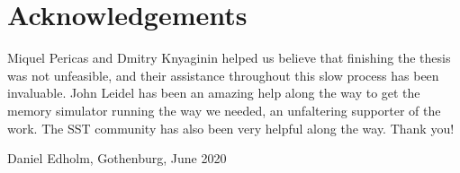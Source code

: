 \thispagestyle{plain}			%
\section*{Acknowledgements}
Miquel Pericas and Dmitry Knyaginin helped us believe that finishing the thesis was not unfeasible, and their assistance throughout this slow process has been invaluable. John Leidel has been an amazing help along the way to get the memory simulator running the way we needed, an unfaltering supporter of the work. The SST community has also been very helpful along the way. Thank you!

\vspace{1.5cm}
\hfill
Daniel Edholm, Gothenburg, June 2020%

\newpage				%
\thispagestyle{empty}
\mbox{}